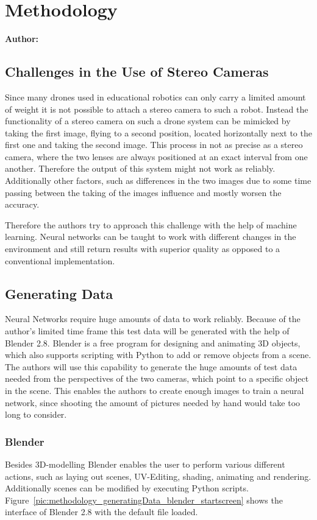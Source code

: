 \chapter{Methodology}

\textbf{Author: } 

\section{Challenges in the Use of Stereo Cameras}
Since many drones used in educational robotics can only carry a limited amount of weight it is not possible to attach a stereo camera to such a robot. Instead the functionality of a stereo camera on such a drone system can be mimicked by taking the first image, flying to a second position, located horizontally next to the first one and taking the second image. This process in not as precise as a stereo camera, where the two lenses are always positioned at an exact interval from one another. Therefore the output of this system might not work as reliably. Additionally other factors, such as differences in the two images due to some time passing between the taking of the images influence and mostly worsen the accuracy.

Therefore the authors try to approach this challenge with the help of machine learning. Neural networks can be taught to work with different changes in the environment and still return results with superior quality as opposed to a conventional implementation.

\section{Generating Data}
Neural Networks require huge amounts of data to work reliably. Because of the author's limited time frame this test data will be generated with the help of Blender 2.8. Blender is a free program for designing and animating 3D objects, which also supports scripting with Python to add or remove objects from a scene. The authors will use this capability to generate the huge amounts of test data needed from the perspectives of the two cameras, which point to a specific object in the scene. This enables the authors to create enough images to train a neural network, since shooting the amount of pictures needed by hand would take too long to consider. 

\subsection{Blender}
Besides 3D-modelling Blender enables the user to perform various different actions, such as laying out scenes, UV-Editing, shading, animating and rendering. Additionally scenes can be modified by executing Python scripts. Figure~\ref{pic:methodology_generatingData_blender_startscreen} shows the interface of Blender 2.8 with the default file loaded.

